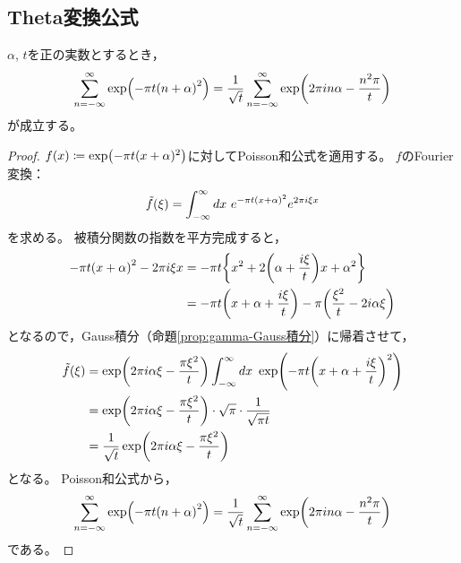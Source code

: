 \documentclass[a4paper,draft]{ltjsarticle}
\begin{document}
\subsection{Theta変換公式}
\begin{thm}[Theta変換公式]
    $\alpha$, $t$を正の実数とするとき，
    \begin{equation}
        \sum_{n=-\infty}^\infty \fun{\exp}{-\pi t\pare{n+\alpha}^2}
        =\dfrac{1}{\sqrt{t}}\sum_{n=-\infty}^\infty \fun{\exp}{2\pi i n\alpha -\dfrac{n^2\pi}{t}}
    \end{equation}    
    が成立する。

    \begin{proof}
        $\fun{f}{x}\coloneqq \fun{\exp}{-\pi t \spare{x+\alpha}^2 }$に対してPoisson和公式を適用する。
        $f$のFourier変換：
        \begin{equation}
            \fun{\tilde{f}}{\xi}=\int_{-\infty}^\infty dx\ e^{-\pi t\pare{x+\alpha}^2}e^{2\pi i \xi x}
        \end{equation}
        を求める。
        被積分関数の指数を平方完成すると，
        \begin{align}
            -\pi t \pare{x+\alpha}^2-2\pi i \xi x
            &= -\pi t \bra{
                x^2+2\pare{\alpha+\dfrac{i\xi}{t}}x+\alpha^2
            }
            \\
            &=-\pi t \pare{x+\alpha+\dfrac{i\xi}{t}}-\pi\pare{\dfrac{\xi^2}{t}-2i \alpha \xi}
        \end{align}
        となるので，Gauss積分（命題\ref{prop:gamma-Gauss積分}）に帰着させて，
        \begin{align}
            \fun{\tilde{f}}{\xi}
            &=\fun{\exp}{2\pi i \alpha \xi -\dfrac{\pi \xi^2}{t}}\int_{-\infty}^\infty dx\ \fun{\exp}{-\pi t\pare{x+\alpha+\dfrac{i\xi}{t}}^2}
            \\
            &=\fun{\exp}{2\pi i \alpha \xi -\dfrac{\pi \xi^2}{t}}\cdot \sqrt{\pi}\cdot\dfrac{1}{\sqrt{\pi t}}
            \\
            &=\dfrac{1}{\sqrt{t}}\fun{\exp}{2\pi i \alpha \xi-\dfrac{\pi\xi^2}{t}}
        \end{align}
        となる。
        Poisson和公式から，
        \begin{equation}
            \sum_{n=-\infty}^\infty \fun{\exp}{-\pi t\pare{n+\alpha}^2}
        =\dfrac{1}{\sqrt{t}}\sum_{n=-\infty}^\infty \fun{\exp}{2\pi i n\alpha -\dfrac{n^2\pi}{t}}
        \end{equation}
        である。
    \end{proof}
\end{thm}
\end{document}
